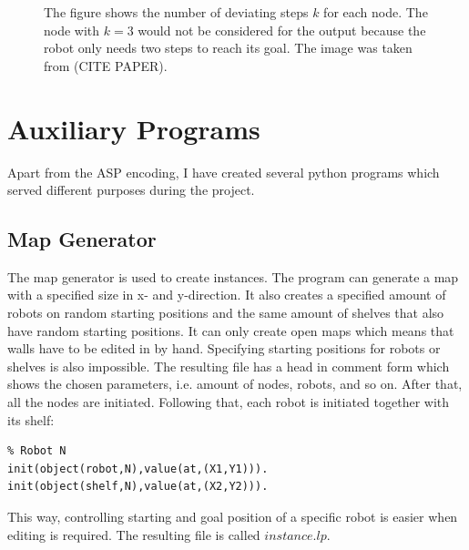 \documentclass[runningheads]{llncs}
\begin{document}
\begin{figure}[h]
\caption{The figure shows the number of deviating steps $k$ for each node. The node with $k=3$ would not be considered for the output because the robot only needs two steps to reach its goal. The image was taken from (CITE PAPER).}
\label{fig:rn}
\end{figure}

\section{Auxiliary Programs}
Apart from the ASP encoding, I have created several python programs which served different purposes during the project.
\subsection{Map Generator}
The map generator is used to create instances. The program can generate a map with a specified size in x- and y-direction. It also creates a specified amount of robots on random starting positions and the same amount of shelves that also have random starting positions. It can only create open maps which means that walls have to be edited in by hand. Specifying starting positions for robots or shelves is also impossible. The resulting file has a head in comment form which shows the chosen parameters, i.e. amount of nodes, robots, and so on. After that, all the nodes are initiated. Following that, each robot is initiated together with its shelf:
\begin{verbatim}
% Robot N
init(object(robot,N),value(at,(X1,Y1))).
init(object(shelf,N),value(at,(X2,Y2))).
\end{verbatim}
This way, controlling starting and goal position of a specific robot is easier when editing is required. The resulting file is called $instance.lp$.
\end{document}
